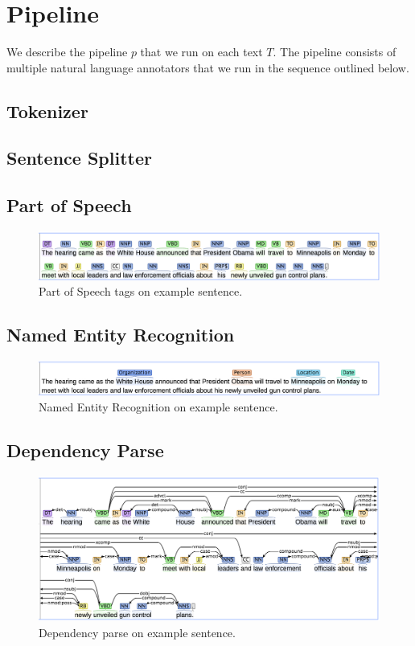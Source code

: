 
\section{Pipeline}
We describe the pipeline $p$ that we run on each text $T$. The pipeline
consists of multiple natural language annotators that we run in 
the sequence outlined below.
\citep{manning2014stanford}
\subsection{Tokenizer}
\subsection{Sentence Splitter}
\subsection{Part of Speech}

\begin{figure}
\includegraphics[scale=0.33]{figures/pos.png}
\caption{
\label{fig:pos}
Part of Speech tags on example sentence.
}
\end{figure}

\citet{toutanova2003tagger}
\subsection{Named Entity Recognition}

\begin{figure}
\includegraphics[scale=0.33]{figures/ner.png}
\caption{
\label{fig:ner}
Named Entity Recognition on example sentence.
}
\end{figure}

\citet{finkel2005incorporating}
\subsection{Dependency Parse}

\begin{figure}
\includegraphics[scale=0.33]{figures/dep.png}
\caption{
\label{fig:dep}
Dependency parse on example sentence.
}
\end{figure}

